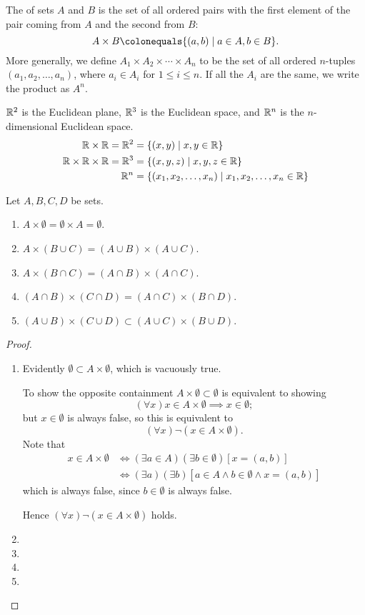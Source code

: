 The  of sets $A$ and $B$ is the set of all ordered pairs with the first element of the pair coming from $A$ and the second from $B$:
\[A\times B\colonequals\{(a,b)\mid a\in A,b\in B\}.\]
More generally, we define $A_1 \times A_2 \times \cdots \times A_n$ to be the set of all ordered $n$-tuples $(a_1, a_2, \dots, a_n)$, where $a_i \in A_i$ for $1 \le i \le n$. If all the $A_i$ are the same, we write the product as $A^n$.

\begin{example}
$\mathbb R^2$ is the Euclidean plane, $\mathbb R^3$ is the Euclidean space, and $\mathbb R^n$ is the $n$-dimensional Euclidean space.
\begin{align*}
\mathbb R \times \mathbb R = \mathbb R^2 &= \{(x,y) \mid x,y \in \mathbb R\} \\
\mathbb R \times \mathbb R \times \mathbb R = \mathbb R^3 &= \{(x,y,z) \mid x,y,z \in \mathbb R\} \\
\mathbb R^n &= \{(x_1,x_2,\dots,x_n) \mid x_1,x_2,\dots,x_n \in \mathbb R\}
\end{align*}
\end{example}

\begin{lemma}
Let $A,B,C,D$ be sets.
\begin{enumerate}[label=(\roman*)]
\item $A\times\emptyset=\emptyset\times A=\emptyset$.
\item $A\times(B\cup C)=(A\cup B)\times(A\cup C)$.
\item $A\times(B\cap C)=(A\cap B)\times(A\cap C)$.
\item $(A\cap B)\times(C\cap D)=(A\cap C)\times(B\cap D)$.
\item $(A\cup B)\times(C\cup D)\subset(A\cup C)\times(B\cup D)$.
\end{enumerate}
\end{lemma}

\begin{proof} \
\begin{enumerate}[label=(\roman*)]
\item Evidently $\emptyset\subset A\times\emptyset$, which is vacuously true.

To show the opposite containment $A\times\emptyset\subset\emptyset$ is equivalent to showing
\[(\forall x)x\in A\times\emptyset\implies x\in\emptyset;\]
but $x\in\emptyset$ is always false, so this is equivalent to
\[(\forall x)\lnot(x\in A\times\emptyset).\]
Note that
\begin{align*}
x\in A\times\emptyset
&\iff(\exists a\in A)(\exists b\in\emptyset)[x=(a,b)]\\
&\iff(\exists a)(\exists b)[a\in A\land b\in\emptyset\land x=(a,b)]
\end{align*}
which is always false, since $b\in\emptyset$ is always false.

Hence $(\forall x)\lnot(x\in A\times\emptyset)$ holds.

\item 
\item 
\item 
\item 
\end{enumerate}
\end{proof}

